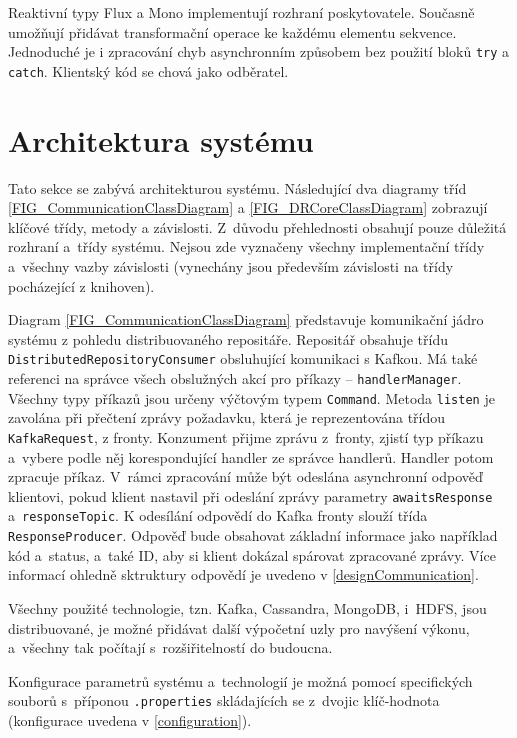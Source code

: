 \noindent Reaktivní typy Flux a Mono implementují rozhraní poskytovatele. Současně umožňují přidávat transformační operace ke každému elementu sekvence. Jednoduché je i zpracování chyb asynchronním způsobem bez použití bloků \texttt{try} a \texttt{catch}. Klientský kód se chová jako odběratel.

\section{Architektura systému} \label{architecture}
Tato sekce se zabývá architekturou systému. Následující dva diagramy tříd \ref{FIG_CommunicationClassDiagram} a \ref{FIG_DRCoreClassDiagram} zobrazují klíčové třídy, metody a závislosti. Z~důvodu přehlednosti obsahují pouze důležitá rozhraní a~třídy systému. Nejsou zde vyznačeny všechny implementační třídy a~všechny vazby závislosti (vynechány jsou především závislosti na třídy pocházející z knihoven).

Diagram \ref{FIG_CommunicationClassDiagram} představuje komunikační jádro systému z pohledu distribuovaného repositáře. Repositář obsahuje třídu \texttt{DistributedRepositoryConsumer} obsluhující komunikaci s Kafkou. Má také referenci na správce všech obslužných akcí pro příkazy -- \texttt{handlerManager}. Všechny typy příkazů jsou určeny výčtovým typem \texttt{Command}. Metoda \texttt{listen} je zavolána při přečtení zprávy požadavku, která je reprezentována třídou \texttt{KafkaRequest}, z fronty. Konzument přijme zprávu z~fronty, zjistí typ příkazu a~vybere podle něj korespondující handler ze správce handlerů. Handler potom zpracuje příkaz. V~rámci zpracování může být odeslána asynchronní odpověď klientovi, pokud klient nastavil při odeslání zprávy parametry \texttt{awaitsResponse} a~\texttt{responseTopic}. K odesílání odpovědí do Kafka fronty slouží třída \texttt{ResponseProducer}. Odpověď bude obsahovat základní informace jako například kód a~status, a~také ID, aby si klient dokázal spárovat zpracované zprávy. Více informací ohledně sktruktury odpovědí je uvedeno v \ref{designCommunication}.








Všechny použité technologie, tzn. Kafka, Cassandra, MongoDB, i~HDFS, jsou distribuované, je možné přidávat další výpočetní uzly pro navýšení výkonu, a~všechny tak počítají s~rozšiřitelností do budoucna.

Konfigurace parametrů systému a~technologií je možná pomocí specifických souborů s~příponou \texttt{.properties} skládajících se z~dvojic klíč-hodnota (konfigurace uvedena v \ref{configuration}).


